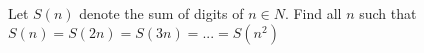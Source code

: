 Let $S(n)$ denote the sum of digits of $n \in N$. Find all $n$ such that $S(n) = S(2n) = S(3n) =... = S(n^2)$